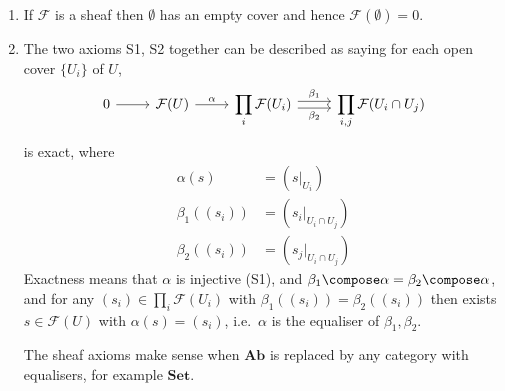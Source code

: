 \documentclass[a4paper]{article}
\renewcommand{\c}[1]{\mathbf{#1}} %
\newcommand{\sh}[1]{\mathcal{#1}} %
\begin{document}
\begin{remark}\leavevmode
  \begin{enumerate}
  \item If \(\sh F\) is a sheaf then \(\emptyset\) has an empty cover and hence \(\sh F(\emptyset) = 0\).
  \item The two axioms S1, S2 together can be described as saying for each open cover \(\{U_i\}\) of \(U\),
    \[
      \begin{tikzcd}
        0 \ar[r] & \sh F(U) \ar[r, "\alpha"] & \displaystyle\prod_i \sh F(U_i) \ar[r, "\beta_1", shift left] \ar[r, "\beta_2"', shift right] & \displaystyle\prod_{i, j} \sh F(U_i \cap U_j)
      \end{tikzcd}
    \]
    is exact, where
    \begin{align*}
      \alpha(s) &= (s|_{U_i}) \\
      \beta_1((s_i)) &= (s_i|_{U_i \cap U_j}) \\
      \beta_2((s_i)) &= (s_j|_{U_i \cap U_j})
    \end{align*}
    Exactness means that \(\alpha\) is injective (S1), and \(\beta_1 \compose \alpha = \beta_2 \compose \alpha\), and for any \((s_i) \in \prod_i \sh F(U_i)\) with \(\beta_1((s_i)) = \beta_2((s_i))\) then exists \(s \in \sh F(U)\) with \(\alpha(s) = (s_i)\), i.e.\ \(\alpha\) is the equaliser of \(\beta_1, \beta_2\).

    The sheaf axioms make sense when \(\c{Ab}\) is replaced by any category with equalisers, for example \(\c{Set}\).
  \end{enumerate}
\end{remark}
\end{document}
